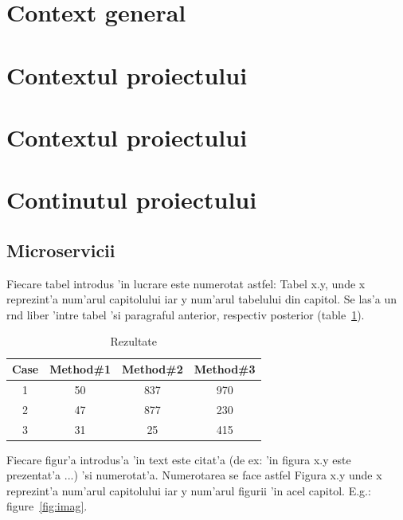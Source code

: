 \documentclass[12pt,a4paper,twoside]{report}
\begin{document}
\section{Context general}


\section{Contextul proiectului}


\section{Contextul proiectului}
\section{Continutul proiectului}
\subsection{Microservicii}

Fiecare tabel introdus 'in lucrare este numerotat astfel: Tabel x.y, unde x reprezint'a num'arul capitolului iar y num'arul tabelului din capitol. 
Se las'a un r\ia nd liber 'intre tabel 'si paragraful anterior, respectiv posterior (table~\ref{table:nonlin}).

\begin{table}[ht]
\caption{Rezultate}
\centering                          %
\begin{tabular}{|c|c|c|c|}          %
\hline\hline                        %
Case & Method\#1 & Method\#2 & Method\#3 \\ [0.5ex]   %
\hline                              %
1 & 50 & 837 & 970 \\               %
2 & 47 & 877 & 230 \\
3 & 31 & 25 & 415 \\[1ex]           %
\hline                              
\end{tabular}
\label{table:nonlin}                %
\end{table}

Fiecare figur'a introdus'a 'in text este citat'a (de ex: 'in figura x.y este prezentat'a ...) 'si numerotat'a. 
Numerotarea se face astfel Figura x.y unde x reprezint'a num'arul capitolului iar y num'arul figurii 'in acel capitol. 
E.g.: figure~\ref{fig:imag}.
\end{document}
